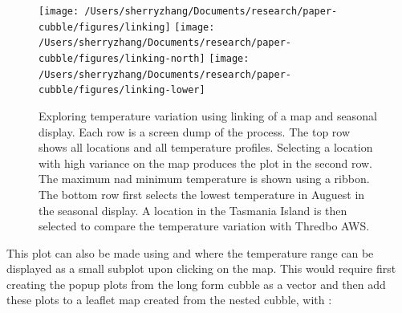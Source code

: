 \documentclass[
]{jss}
\begin{document}
\begin{CodeChunk}
\begin{figure}

{\centering \texttt{[image: /Users/sherryzhang/Documents/research/paper-cubble/figures/linking]} \texttt{[image: /Users/sherryzhang/Documents/research/paper-cubble/figures/linking-north]} \texttt{[image: /Users/sherryzhang/Documents/research/paper-cubble/figures/linking-lower]} 

}

\caption[Exploring temperature variation using linking of a map and seasonal display]{Exploring temperature variation using linking of a map and seasonal display. Each row is a screen dump of the process. The top row shows all locations and all temperature profiles. Selecting a location with high variance on the map produces the plot in the second row. The maximum nad minimum temperature is shown using a ribbon. The bottom row first selects the lowest temperature in Auguest in the seasonal display. A location in the Tasmania Island is then selected to compare the temperature variation with Thredbo AWS.}\label{fig:interactive-linking}
\end{figure}
\end{CodeChunk}

This plot can also be made using  and  where
the temperature range can be displayed as a small subplot upon clicking
on the map. This would require first creating the popup plots from the
long form cubble as a vector and then add these plots to a leaflet map
created from the nested cubble, with :
\end{document}
